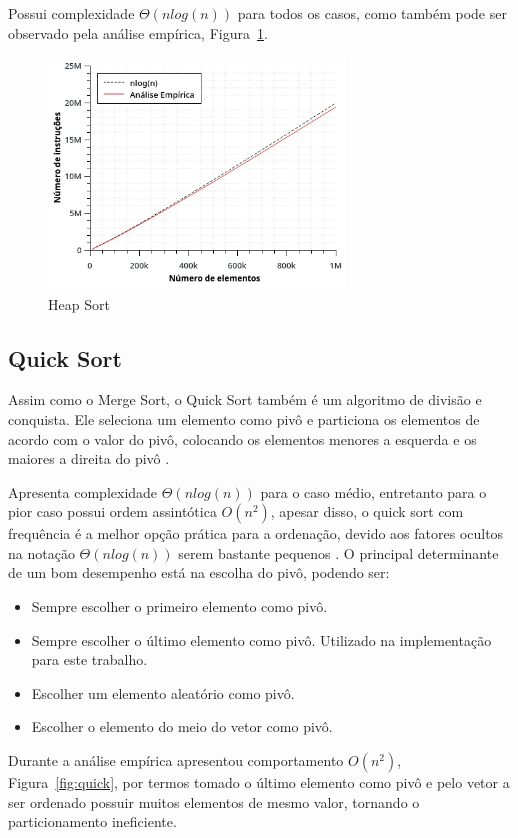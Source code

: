 Possui complexidade $\Theta(nlog(n))$ para todos os casos, como também pode ser observado pela análise empírica, Figura~\ref{fig:heap}.
\begin{figure}[h]
\centering
\includegraphics[width=0.7\textwidth]{images/heap_graph.jpg}
\caption{Heap Sort}
\label{fig:heap}
\end{figure}

\subsection{Quick Sort}
Assim como o Merge Sort, o Quick Sort também é um algoritmo de divisão e conquista. Ele seleciona um elemento como pivô e particiona os elementos de acordo com o valor do pivô, colocando os elementos menores a esquerda e os maiores a direita do pivô \cite{geeks:02}.

Apresenta complexidade $\Theta(nlog(n))$ para o caso médio, entretanto para o pior caso possui ordem assintótica $O(n^2)$, apesar disso, o quick sort com frequência é a melhor opção prática para a ordenação, devido aos fatores ocultos na notação $\Theta(nlog(n))$ serem bastante pequenos \cite{cormen:01}.
O principal determinante de um bom desempenho está na escolha do pivô, podendo ser:
\begin{itemize}
\item Sempre escolher o primeiro elemento como pivô.
\item Sempre escolher o último elemento como pivô. Utilizado na implementação para este trabalho.
\item Escolher um elemento aleatório como pivô.
\item Escolher o elemento do meio do vetor como pivô.
\end{itemize}

Durante a análise empírica apresentou comportamento $O(n^2)$, Figura~\ref{fig:quick}, por termos tomado o último elemento como pivô e pelo vetor a ser ordenado possuir muitos elementos de mesmo valor, tornando o particionamento ineficiente.

